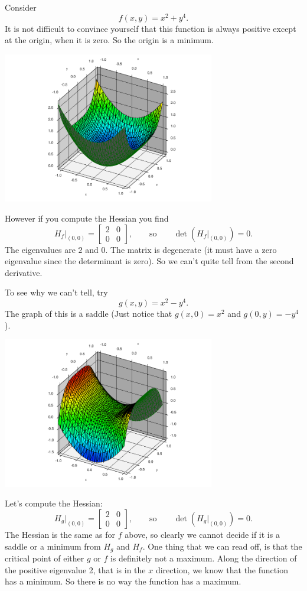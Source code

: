 \documentclass[12pt]{article}
\begin{document}
Consider
$$
f(x,y) = x^2 + y^4 .
$$
It is not difficult to convince yourself that this function is always
positive except at the origin, when it is zero.  So the origin is a minimum.
\begin{center}
\includegraphics[width=3.65in]{degenerate-min.pdf}
\end{center}

However if you compute the Hessian  you find
$$
H_f\big|_{(0,0)} =
\begin{bmatrix}
2 & 0 \\
0 & 0
\end{bmatrix} ,
\qquad \text{so} \qquad
\det(H_f\big|_{(0,0)}) = 0 .
$$
The eigenvalues are $2$ and $0$.
The matrix is degenerate (it must have a zero eigenvalue since the
determinant is zero).  So we can't quite tell from the second derivative.

To see why we can't tell, try
$$
g(x,y) = x^2 - y^4 .
$$
The graph of this is a saddle (Just notice that $g(x,0) = x^2$ and
$g(0,y) = -y^4$).
\begin{center}
\includegraphics[width=3.65in]{degenerate-saddle.pdf}
\end{center}

Let's compute the Hessian:
$$
H_g\big|_{(0,0)} =
\begin{bmatrix}
2 & 0 \\
0 & 0
\end{bmatrix}
,
\qquad \text{so} \qquad
\det(H_g\big|_{(0,0)}) = 0 .
$$
The Hessian is the same as for $f$ above, so clearly we cannot decide
if it is a saddle or a minimum
from $H_g$ and $H_f$.  One thing that we can read off, is that the critical
point of either $g$ or $f$ is definitely not a maximum.
Along the direction of the positive eigenvalue 2, that is in the $x$
direction, we know that the function
has a minimum.  So there is no way the function has a maximum.
\end{document}
